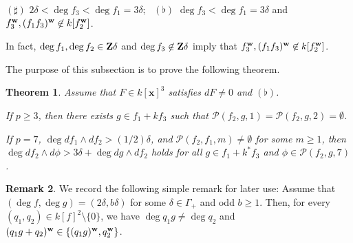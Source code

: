 \documentclass{amsart}
\theoremstyle{plain}
\newtheorem{thm}{Theorem}[section]
\theoremstyle{definition}
\newtheorem{rem}[thm]{Remark}
\newcommand{\zs}{\{ 0\} }
\newcommand{\sm}{\setminus}
\newcommand{\nd}{\noindent}
\newcommand{\Z}{{\bf Z}}
\newcommand{\x}{{\boldsymbol x}}
\newcommand{\w}{{\bf w}}
\newcommand{\kx}{k[\x]}
\begin{document}
$(\sharp )$ 
$2\delta <\deg f_3<\deg f_1=3\delta $; \ 
$(\flat )$ 
$\deg f_3<\deg f_1=3\delta $ 
and $f_3^{\w },(f_1f_3)^{\w }\not\in k[f_2^{\w }]$. 


\nd 
In fact, 
$\deg f_1,\deg f_2\in \Z \delta $ and $\deg f_3\not\in \Z \delta $ 
imply that $f_3^{\w },(f_1f_3)^{\w }\not\in k[f_2^{\w }]$. 


The purpose of this subsection is to prove the following theorem. 



\begin{thm}\label{thm:modification}
Assume that $F\in \kx ^3$ satisfies $dF\ne 0$ and $(\flat )$. 


\nd{\rm (i)} 
If $p\ge 3$, 
then there exists $g\in f_1+kf_3$ such that 
$\mathcal{P}(f_2,g,1)=\mathcal{P}(f_2,g,2)=\emptyset $. 


\nd{\rm (ii)} 
If $p=7$, 
$\deg df_1\wedge df_2>(1/2)\delta $, and 
$\mathcal{P}(f_2,f_1,m)\ne \emptyset $ for some $m\ge 1$, 
then 
$\deg df_2\wedge d\phi >3\delta +\deg dg\wedge df_2$ 
holds for all 
$g\in f_1+k^*f_3$ and $\phi \in \mathcal{P}(f_2,g,7)$. 

\end{thm}


\begin{rem}\label{rem:parity}\rm 
We record the following simple remark for later use: 
Assume that 
$(\deg f,\deg g)=(2\delta ,b\delta )$ 
for some $\delta \in \Gamma _+$ and odd $b\ge 1$. 
Then, 
for every $(q_1,q_2)\in k[f]^2\sm \zs $, 
we have $\deg q_1g\ne \deg q_2$ 
and $(q_1g+q_2)^{\w }\in \{ (q_1g)^{\w },q_2^{\w }\} $. 
\end{rem}
\end{document}
